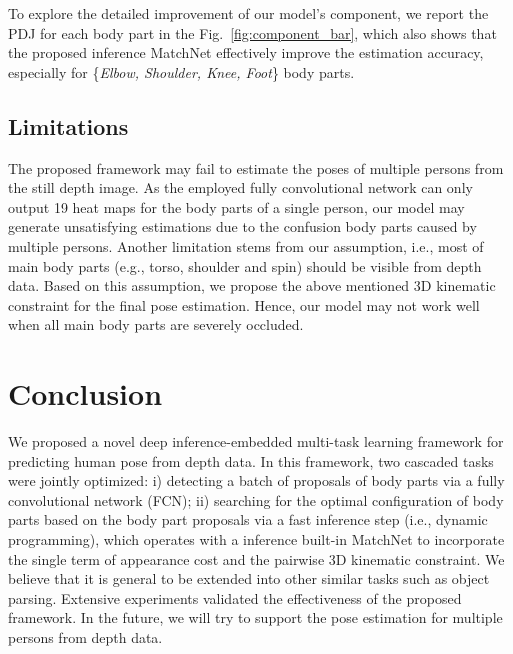 \documentclass{sig-alternate-05-2015}
\begin{document}
To explore the detailed improvement of our model's component, we report the PDJ for each body part in the Fig.~\ref{fig:component_bar}, which also shows that the proposed inference MatchNet effectively improve the estimation accuracy, especially for \{\emph{Elbow, Shoulder, Knee, Foot}\} body parts. 

%

\subsection{Limitations}
The proposed framework may fail to estimate the poses of multiple persons from the still depth image. As the employed fully convolutional network can only output 19 heat maps for the body parts of a single person, our model may generate unsatisfying estimations due to the confusion body parts caused by multiple persons. Another limitation stems from our assumption, i.e., most of main body parts (e.g., torso, shoulder and spin) should be visible from depth data. Based on this assumption, we propose the above mentioned 3D kinematic constraint for the final pose estimation. Hence, our model may not work well when all main body parts are severely occluded. 


\section{Conclusion}
\label{sec:con}
We proposed a novel deep inference-embedded multi-task learning framework for predicting human pose from depth data. In this framework, two cascaded tasks were jointly optimized: i) detecting a batch of proposals of body parts via a fully convolutional network (FCN); ii) searching for the optimal configuration of body parts based on the body part proposals via a fast inference step (i.e., dynamic programming), which operates with a inference built-in MatchNet to incorporate the single term of appearance cost and the pairwise 3D kinematic constraint. We believe that it is general to be extended into other similar tasks such as object parsing. Extensive experiments validated the effectiveness of the proposed framework. In the future, we will try to support the pose estimation for multiple persons from depth data. 


\end{document}
